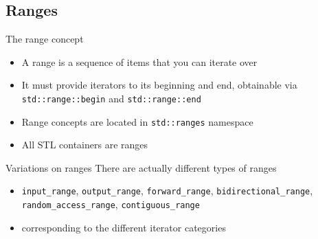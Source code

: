 \subsection[range]{Ranges}

\begin{frame}[fragile]
  \begin{block}{The range concept}
    \begin{itemize}
    \item A range is a sequence of items that you can iterate over
    \item It must provide iterators to its beginning and end, obtainable via \texttt{std::range::begin} and \texttt{std::range::end}
    \item Range concepts are located in \texttt{std::ranges} namespace
    \item All STL containers are ranges
    \end{itemize}
  \end{block}
  \begin{exampleblock}{Variations on ranges}
    There are actually different types of ranges
    \begin{itemize}
    \item \texttt{input_range}, \texttt{output_range}, \texttt{forward_range}, \texttt{bidirectional_range}, \texttt{random_access_range}, \texttt{contiguous_range}
    \item corresponding to the different iterator categories
    \end{itemize}
  \end{exampleblock}
\end{frame}


